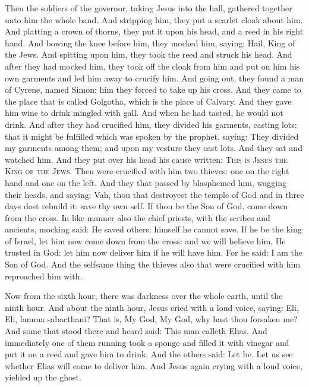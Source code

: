 Then the soldiers of the governor, taking Jesus into the hall, gathered
together unto him the whole band.  And stripping him, they put a scarlet cloak
about him.  And platting a crown of thorns, they put it upon his head, and a
reed in his right hand. And bowing the knee before him, they mocked him,
saying: Hail, King of the Jews.  And spitting upon him, they took the reed and
struck his head.  And after they had mocked him, they took off the cloak from
him and put on him his own garments and led him away to crucify him.  And going
out, they found a man of Cyrene, named Simon: him they forced to take up his
cross.  And they came to the place that is called Golgotha, which is the place
of Calvary.  And they gave him wine to drink mingled with gall. And when he had
tasted, he would not drink.  And after they had crucified him, they divided his
garments, casting lots; that it might be fulfilled which was spoken by the
prophet, saying: They divided my garments among them; and upon my vesture they
cast lots.  And they sat and watched him.  And they put over his head his cause
written: \textsc{This is Jesus the King of the Jews}.  Then were crucified with
him two thieves: one on the right hand and one on the left.  And they that
passed by blasphemed him, wagging their heads, and saying: Vah, thou that
destroyest the temple of God and in three days dost rebuild it: save thy own
self. If thou be the Son of God, come down from the cross.  In like manner also
the chief priests, with the scribes and ancients, mocking said: He saved
others: himself he cannot save. If he be the king of Israel, let him now come
down from the cross: and we will believe him.  He trusted in God: let him now
deliver him if he will have him.  For he said: I am the Son of God.  And the
selfsame thing the thieves also that were crucified with him reproached him
with.  

Now from the sixth hour, there was darkness over the whole earth, until the
ninth hour.  And about the ninth hour, Jesus cried with a loud voice, saying:
Eli, Eli, lamma sabacthani? That is, My God, My God, why hast thou forsaken me?
And some that stood there and heard said: This man calleth Elias.  And
immediately one of them running took a sponge and filled it with vinegar and
put it on a reed and gave him to drink.  And the others said: Let be. Let us
see whether Elias will come to deliver him.  And Jesus again crying with a loud
voice, yielded up the ghost.  

